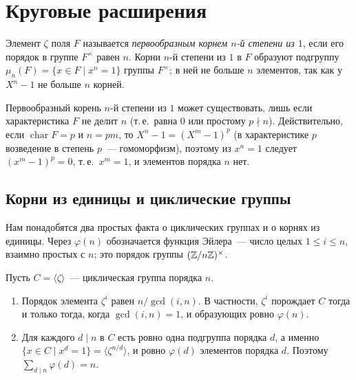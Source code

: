 \makeatletter
{}
\makeatother
\section{Круговые расширения}

Элемент $\zeta$ поля $F$ называется \emph{первообразным корнем $n$-й степени из $1$},
если его порядок в группе $F^\times$ равен $n$. Корни $n$-й степени из $1$ в $F$ образуют подгруппу
$\mu_n(F)=\{x\in F\mid x^n=1\}$ группы $F^\times$; в ней не больше $n$ элементов, так как у $X^n-1$ не больше $n$ корней.

Первообразный корень $n$-й степени из $1$ может существовать, лишь если характеристика $F$ не делит $n$ (т.\,е.\ равна
$0$ или простому $p\nmid n$). Действительно, если $\operatorname{char}F=p$ и $n=pm$, то $X^n-1=(X^m-1)^p$ (в
характеристике $p$ возведение в степень $p$~--- гомоморфизм), поэтому из $x^n=1$ следует $(x^m-1)^p=0$, т.\,е.\
$x^m=1$, и элементов порядка $n$ нет.

\subsection*{Корни из единицы и циклические группы}

Нам понадобятся два простых факта о циклических группах и о корнях из единицы. Через $\varphi(n)$ обозначается
функция Эйлера~--- число целых $1\le i\le n$, взаимно простых с $n$; это порядок группы $(\mathbb Z/n\mathbb Z)^\times$.

\begin{lemma}[5.7b]
Пусть $C=\langle\zeta\rangle$~--- циклическая группа порядка $n$.
\begin{enumerate}[label=\textup{(\alph*)}]
\item Порядок элемента $\zeta^i$ равен $n/\gcd(i,n)$. В частности, $\zeta^i$ порождает $C$ тогда и только тогда, когда
$\gcd(i,n)=1$, и образующих ровно $\varphi(n)$.
\item Для каждого $d\mid n$ в $C$ есть ровно одна подгруппа порядка $d$, а именно $\{x\in C\mid x^d=1\}=\langle\zeta^{n/d}\rangle$,
и ровно $\varphi(d)$ элементов порядка $d$. Поэтому $\sum_{d\mid n}\varphi(d)=n$.
\end{enumerate}
\end{lemma}

